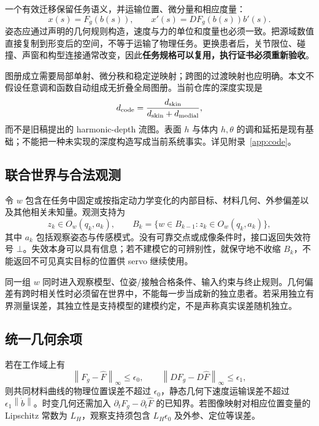 \documentclass[11pt,a4paper]{article}
\theoremstyle{cn}
\newcommand{\norm}[1]{\left\lVert #1\right\rVert}
\begin{document}
一个有效迁移保留任务语义，并运输位置、微分量和相应度量：
\begin{equation}
x(s)=F_g(b(s)),\qquad x'(s)=DF_g(b(s))b'(s).
\label{eq:transport}
\end{equation}
姿态应通过声明的几何规则构造，速度与力的单位和度量也必须一致。把源域数值直接复制到形变后的空间，不等于运输了物理任务。更换患者后，关节限位、碰撞、声窗和构型连接通常改变，因此\textbf{任务规格可以复用，执行证书必须重新验收}。

图册成立需要局部单射、微分秩和稳定逆映射；跨图的过渡映射也应明确。本文不假设任意调和函数自动组成无折叠全局图册。当前仓库的深度实现是
\[
d_{\rm code}=\frac{d_{\rm skin}}{d_{\rm skin}+d_{\rm medial}},
\]
而不是旧稿提出的 harmonic-depth 流图。表面 \(h\) 与体内 \(h,\theta\) 的调和延拓是现有基础；不能把一种未实现的深度构造写成当前系统事实。详见附录~\ref{app:code}。

\subsection{联合世界与合法观测}

令 \(w\) 包含在任务中固定或按指定动力学变化的内部目标、材料几何、外参偏差以及其他相关未知量。观测支持为
\begin{equation}
z_k\in O_w(q_k,a_k),\qquad
B_k=\{w\in B_{k-1}:z_k\in O_w(q_k,a_k)\},
\label{eq:posterior}
\end{equation}
其中 \(a_k\) 包括观察姿态与传感模式。没有可靠交点或成像条件时，接口返回失效符号 \(\bot\)。失效本身可以具有信息；若不建模它的可辨别性，就保守地不收缩 \(B_k\)，不能返回不可见真实目标的位置供 servo 继续使用。

同一组 \(w\) 同时进入观察模型、位姿/接触合格条件、输入约束与终止规则。几何偏差有跨时相关性时必须留在世界中，不能每一步当成新的独立患者。若采用独立有界测量误差，其独立性是支持模型的建模约定，不是声称真实误差随机独立。

\subsection{统一几何余项}

若在工作域上有
\begin{equation}
\norm{F_g-\widehat F}_{\infty}\le\epsilon_0,\qquad
\norm{DF_g-D\widehat F}_{\infty}\le\epsilon_1,
\label{eq:geometry}
\end{equation}
则共同材料曲线的物理位置误差不超过 \(\epsilon_0\)，静态几何下速度运输误差不超过 \(\epsilon_1\norm{\dot b}\)。时变几何还需加入 \(\partial_tF_g-\partial_t\widehat F\) 的已知界。若图像映射对相应位置变量的 Lipschitz 常数为 \(L_H\)，观察支持须包含 \(L_H\epsilon_0\) 及外参、定位等误差。
\end{document}
